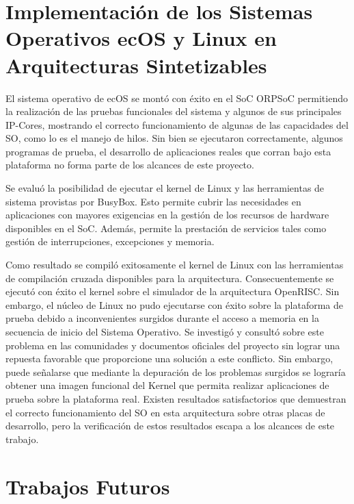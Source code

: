 \section{Implementación de los Sistemas Operativos ecOS y Linux en Arquitecturas Sintetizables}

El sistema operativo de ecOS se montó con éxito en el SoC ORPSoC permitiendo la realización de las pruebas funcionales del
sistema y algunos de sus principales IP-Cores, mostrando el correcto funcionamiento de algunas de las capacidades del SO, como lo es el manejo de
hilos. Sin bien se ejecutaron correctamente, algunos programas de prueba, el desarrollo de aplicaciones reales que corran bajo esta plataforma no forma
parte de los alcances de este proyecto.

Se evaluó la posibilidad de ejecutar el kernel de Linux y las herramientas de sistema provistas por BusyBox. Esto permite cubrir las necesidades en
aplicaciones con mayores exigencias en la gestión de los recursos de hardware disponibles en el SoC. Además, permite la prestación de servicios tales
como gestión de interrupciones, excepciones y memoria.
 
Como resultado se compiló exitosamente el kernel de Linux con las herramientas de compilación cruzada disponibles para la arquitectura.
Consecuentemente se ejecutó con éxito el kernel sobre el simulador de la arquitectura OpenRISC. Sin embargo, el núcleo de Linux no pudo ejecutarse
con éxito sobre la plataforma de prueba debido a inconvenientes surgidos durante el acceso a memoria en la secuencia de inicio del Sistema Operativo.
Se investigó y consultó sobre este problema en las comunidades y documentos oficiales del proyecto sin lograr una repuesta favorable que proporcione
una solución a este conflicto. Sin embargo, puede señalarse que mediante la depuración de los problemas surgidos se lograría obtener una imagen
funcional del Kernel que permita realizar aplicaciones de prueba sobre la plataforma real. Existen resultados satisfactorios que demuestran el correcto
funcionamiento del SO en esta arquitectura sobre otras placas de desarrollo, pero la verificación de estos resultados escapa a los alcances de este
trabajo.

\section{Trabajos Futuros}


